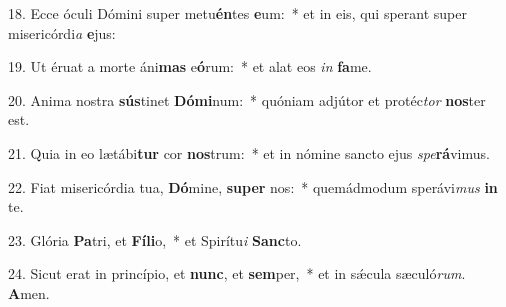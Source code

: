 18. Ecce óculi Dómini super metu\textbf{én}tes \textbf{e}um:~*  et in eis, qui sperant super misericórdi\textit{a} \textbf{e}jus:\

19. Ut éruat a morte áni\textbf{mas} e\textbf{ó}rum:~*  et alat eos \textit{in} \textbf{fa}me.\

20. Anima nostra \textbf{sús}tinet \textbf{Dó}\textbf{mi}num:~*  quóniam adjútor et protéc\textit{tor} \textbf{nos}ter est.\

21. Quia in eo lætábi\textbf{tur} cor \textbf{nos}trum:~*  et in nómine sancto ejus \textit{spe}\textbf{rá}vimus.\

22. Fiat misericórdia tua, \textbf{Dó}mine, \textbf{su}\textbf{per} nos:~*  quemádmodum sperávi\textit{mus} \textbf{in} te.\

23. Glória \textbf{Pa}tri, et \textbf{Fí}\textbf{li}o,~*  et Spirítu\textit{i} \textbf{Sanc}to.\

24. Sicut erat in princípio, et \textbf{nunc}, et \textbf{sem}per,~*  et in sǽcula sæculó\textit{rum}. \textbf{A}men.\

